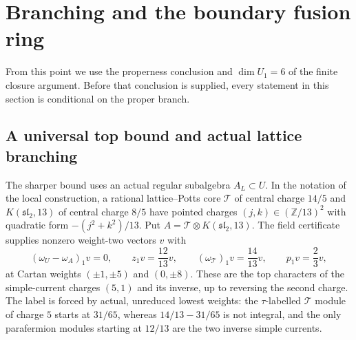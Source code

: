 \section{Branching and the boundary fusion ring}
\label{sec:branching}

From this point we use the properness conclusion and $\dim U_1=6$ of
the finite closure argument. Before that conclusion is supplied, every
statement in this section is conditional on the proper branch.

\subsection{A universal top bound and actual lattice branching}

The sharper bound uses an actual regular subalgebra $A_L\subset U$.
In the notation of the local construction, a rational lattice--Potts
core $\mathcal T$ of central charge $14/5$ and $K(\mathfrak{sl}_2,13)$
of central charge $8/5$ have pointed charges
$(j,k)\in(\mathbb Z/13)^2$ with quadratic form
$-(j^2+k^2)/13$. Put $A=\mathcal T\otimes K(\mathfrak{sl}_2,13)$.
The field certificate supplies nonzero weight-two vectors $v$ with
\[
 (\omega_U-\omega_A)_1v=0,\qquad
 z_1v=\frac{12}{13}v,\qquad
 (\omega_{\mathcal T})_1v=\frac{14}{13}v,
 \qquad p_1v=\frac23v,
\]
at Cartan weights $(\pm1,\pm5)$ and $(0,\pm8)$.
These are the top characters of the simple-current charges
$(5,1)$ and its inverse, up to reversing the second charge.
The label is forced by actual, unreduced lowest weights: the
$\tau$-labelled $\mathcal T$ module of charge $5$ starts at $31/65$,
whereas $14/13-31/65$ is not integral, and the only parafermion modules
starting at $12/13$ are the two inverse simple currents.


